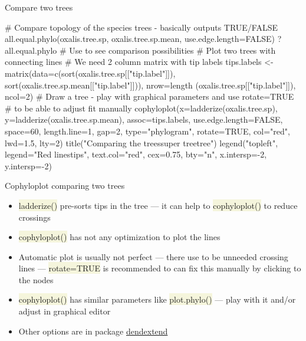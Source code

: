 \documentclass[compress, xelatex, 11pt, xcolor=svgnames, aspectratio=169,
	hyperref={
		bookmarks=true,
		unicode=true,
		colorlinks=true,
		pdftitle={Molecular data in R},
		plainpages=false,
		pdfauthor={Vojtech Zeisek},
		pdfsubject={Course about phylogeny and evolution in R},
		pdfcreator={XeLaTeX},
		pdfkeywords={R, evolution, phylogeny, molecular data},
		linkcolor=Crimson, %
		anchorcolor=Magenta, %
		citecolor=Magenta, %
		filecolor=Magenta, %
		menucolor=Magenta, %
		urlcolor=DodgerBlue, %
		},
	url={hyphens, lowtilde} %
	]{beamer}
\renewcommand{\texttt}[1]{\colorbox{Beige}{{\ttfamily #1}}}
\begin{document}
\begin{frame}[fragile]{Compare two trees}
	\begin{spluscode}
    # Compare topology of the species trees - basically outputs TRUE/FALSE
    all.equal.phylo(oxalis.tree.sp, oxalis.tree.sp.mean, use.edge.length=FALSE)
    ?all.equal.phylo # Use to see comparison possibilities
    # Plot two trees with connecting lines
    # We need 2 column matrix with tip labels
    tips.labels <- matrix(data=c(sort(oxalis.tree.sp[["tip.label"]]),
      sort(oxalis.tree.sp.mean[["tip.label"]])), nrow=length
      (oxalis.tree.sp[["tip.label"]]), ncol=2)
    # Draw a tree - play with graphical parameters and use rotate=TRUE
    # to be able to adjust fit manually
    cophyloplot(x=ladderize(oxalis.tree.sp), y=ladderize(oxalis.tree.sp.mean),
      assoc=tips.labels, use.edge.length=FALSE, space=60, length.line=1, gap=2,
      type="phylogram", rotate=TRUE, col="red", lwd=1.5, lty=2)
    title("Comparing the trees\nParsimony super tree\tSpecies tree")
    legend("topleft", legend="Red lines\nconnect tips", text.col="red",
      cex=0.75, bty="n", x.intersp=-2, y.intersp=-2)
	\end{spluscode}
\end{frame}

\begin{frame}{Cophyloplot comparing two trees}
	\begin{multicols}{2}
		\begin{center}
			\texttt{[image: cophyloplot.png]}
		\end{center}
		\begin{itemize}
			\item \texttt{ladderize()} pre-sorts tips in the tree --- it can help to \texttt{cophyloplot()} to reduce crossings
			\item \texttt{cophyloplot()} has not any optimization to plot the lines
			\item Automatic plot is usually not perfect --- there use to be unneeded crossing lines --- \texttt{rotate=TRUE} is recommended to can fix this manually by clicking to the nodes
			\item \texttt{cophyloplot()} has similar parameters like \texttt{plot.phylo()} --- play with it and/or adjust in graphical editor
			\item Other options are in package \href{https://CRAN.R-project.org/package=dendextend}{dendextend}
		\end{itemize}
	\end{multicols}
\end{frame}
\end{document}
